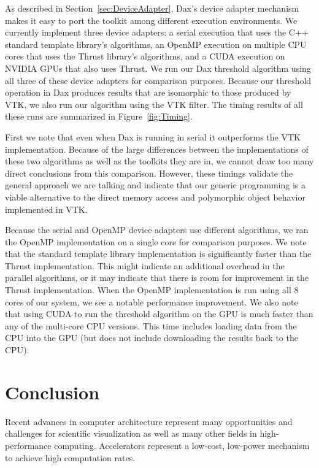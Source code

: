\documentclass[conference]{IEEEtran}
\begin{document}
As described in Section~\ref{sec:DeviceAdapter}, Dax's device adapter
mechanism makes it easy to port the toolkit among different execution
environments.  We currently implement three device adapters: a serial
execution that uses the C++ standard template library's algorithms, an
OpenMP execution on multiple CPU cores that uses the Thrust library's
algorithms, and a CUDA execution on NVIDIA GPUs that also uses Thrust.  We
run our Dax threshold algorithm using all three of these device adapters
for comparison purposes.  Because our threshold operation in Dax produces
results that are isomorphic to those produced by VTK, we also run our
algorithm using the VTK filter.  The timing results of all these runs are
summarized in Figure~\ref{fig:Timing}.

First we note that even when Dax is running in serial it outperforms the
VTK implementation.  Because of the large differences between the
implementations of these two algorithms as well as the toolkits they are
in, we cannot draw too many direct conclusions from this comparison.
However, these timings validate the general approach we are talking and
indicate that our generic programming is a viable alternative to the direct
memory access and polymorphic object behavior implemented in VTK.

Because the serial and OpenMP device adapters use different algorithms, we
ran the OpenMP implementation on a single core for comparison purposes.  We
note that the standard template library implementation is significantly
faster than the Thrust implementation.  This might indicate an additional
overhead in the parallel algorithms, or it may indicate that there is room
for improvement in the Thrust implementation.  When the OpenMP
implementation is run using all 8 cores of our system, we see a notable
performance improvement.  We also note that using CUDA to run the threshold
algorithm on the GPU is much faster than any of the multi-core CPU
versions.  This time includes loading data from the CPU into the GPU (but
does not include downloading the results back to the CPU).

\section{Conclusion}
\label{sec:Conclusion}

\noindent
Recent advances in computer architecture represent many opportunities and
challenges for scientific visualization as well as many other fields in
high-performance computing.  Accelerators represent a low-cost, low-power
mechanism to achieve high computation rates.
\end{document}
